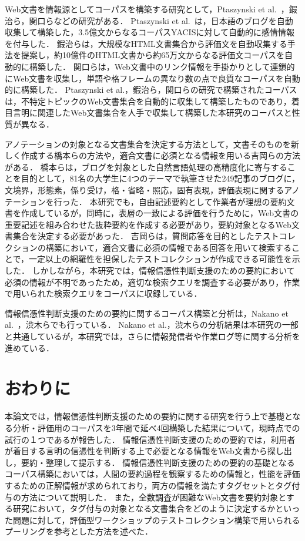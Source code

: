 \documentclass[japanese]{jnlp_1.4}
\begin{document}
Web文書を情報源としてコーパスを構築する研究として，Ptaszynski et al.~\citeyear{Ptaszynski2012}，鍜治ら，関口らなどの研究がある．
Ptaszynski et al.~\citeyear{Ptaszynski2012}は，日本語のブログを自動収集して構築した，3.5億文からなるコーパスYACISに対して自動的に感情情報を付与した．
鍜治ら\citeyear{Kaji2008}は，大規模なHTML文書集合から評価文を自動収集する手法を提案し，約10億件のHTML文書から約65万文からなる評価文コーパスを自動的に構築した．
関口ら\citeyear{Sekiguchi2003}は，Web文書中のリンク情報を手掛かりとして連鎖的にWeb文書を収集し，単語や格フレームの異なり数の点で良質なコーパスを自動的に構築した．
Ptaszynski et al.，鍜治ら，関口らの研究で構築されたコーパスは，不特定トピックのWeb文書集合を自動的に収集して構築したものであり，着目言明に関連したWeb文書集合を人手で収集して構築した本研究のコーパスと性質が異なる．

アノテーションの対象となる文書集合を決定する方法として，文書そのものを新しく作成する橋本ら\citeyear{Hashimoto2011}の方法や，適合文書に必須となる情報を用いる吉岡らの方法がある．
橋本ら\citeyear{Hashimoto2011}は，ブログを対象とした自然言語処理の高精度化に寄与することを目的として，81名の大学生に4つのテーマで執筆させた249記事のブログに，文境界，形態素，係り受け，格・省略・照応，固有表現，評価表現に関するアノテーションを行った．
本研究でも，自由記述要約として作業者が理想の要約文書を作成しているが，同時に，表層の一致による評価を行うために，Web文書の重要記述を組み合わせた抜粋要約を作成する必要があり，要約対象となるWeb文書集合を決定する必要があった．
吉岡ら\citeyear{Yoshioka2012}は，質問応答を目的としたテストコレクションの構築において，適合文書に必須の情報である回答を用いて検索することで，一定以上の網羅性を担保したテストコレクションが作成できる可能性を示した．
しかしながら，本研究では，情報信憑性判断支援のための要約において必須の情報が不明であったため，適切な検索クエリを調査する必要があり，作業で用いられた検索クエリをコーパスに収録している．

情報信憑性判断支援のための要約に関するコーパス構築と分析は，Nakano et al.~\citeyear{Nakano2010}，渋木ら\citeyear{Shibuki2011b}でも行っている．
Nakano et al.，渋木らの分析結果は本研究の一部と共通しているが，本研究では，さらに情報発信者や作業ログ等に関する分析を進めている．


\section{おわりに}
\label{sc:conclusion}


本論文では，情報信憑性判断支援のための要約に関する研究を行う上で基礎となる分析・評価用のコーパスを3年間で延べ4回構築した結果について，{現時点}での試行の１つであるが報告した．
情報信憑性判断支援のための要約では，利用者が着目する言明の信憑性を判断する上で必要となる情報をWeb文書から探し出し，要約・整理して提示する．
情報信憑性判断支援のための要約{の基礎}となるコーパス構築においては，人間の要約過程を観察するための情報と，性能を評価するための正解情報が求められており，両方の情報を満たすタグセットとタグ付与の方法について説明した．
また，全数調査が困難なWeb文書を要約対象とする研究において，タグ付与の対象となる文書集合をどのように決定するかといった問題に対して，評価型ワークショップのテストコレクション構築で用いられるプーリングを参考とした方法を述べた．
\end{document}
